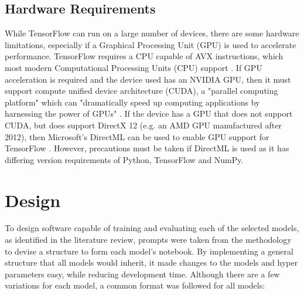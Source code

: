 \subsection{Hardware Requirements}
While TensorFlow can run on a large number of devices, there are some hardware limitations, especially if a Graphical Processing Unit (GPU) is used to accelerate performance. TensorFlow requires a CPU capable of AVX instructions, which most modern Computational Processing Units (CPU) support \citep{InstallT17:online}. If GPU acceleration is required and the device used has an NVIDIA GPU, then it must support compute unified device architecture (CUDA), a "parallel computing platform" which can "dramatically speed up computing applications by harnessing the power of GPUs" \citep{CUDAZone2:online}. If the device has a GPU that does not support CUDA, but does support DirectX 12 (e.g. an AMD GPU manufactured after 2012), then Microsoft's DirectML can be used to enable GPU support for TensorFlow \citep{Introduc93:online}. However, precautions must be taken if DirectML is used as it has differing version requirements of Python, TensorFlow and NumPy.

\section{Design} \label{design}
To design software capable of training and evaluating each of the selected models, as identified in the literature review, prompts were taken from the methodology to devise a structure to form each model’s notebook. By implementing a general structure that all models would inherit, it made changes to the models and hyper parameters easy, while reducing development time. Although there are a few variations for each model, a common format was followed for all models:


